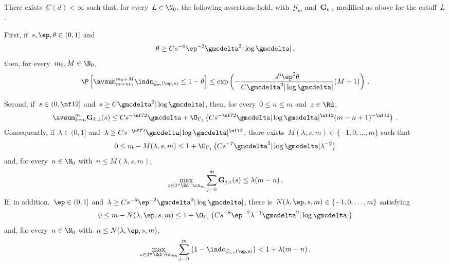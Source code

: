 \documentclass[11pt]{amsart}
\begin{document}
\begin{proposition}
\label{p.cutoff.regularity.good.scales}
There exists~$C(d)<\infty$ such that, for every~$L\in\N_0$, the following assertions hold, with~$\mathcal G_m$ and~$\mathbf G_{k,z}$ modified as above for the cutoff~$L$.

\smallskip

First, if~$s,\ep,\theta\in(0,1]$ and
\begin{equation}
	\theta
	\geq
	Cs^{-6}\ep^{-2}\gmcdelta^2|\log\gmcdelta|\,,
	\label{e.cutoff.regularity.density.parameters}
\end{equation}
then, for every~$m_0,M\in\N_0$,
\begin{equation}
	\P\left[
	\avsum_{m=m_0}^{m_0+M}
	\indc_{\mathcal G_m(\ep,s)}
	\leq
	1-\theta
	\right]
	\leq
	\exp\left(
	-\frac{s^6\ep^2\theta}
	{C\gmcdelta^2|\log\gmcdelta|}(M+1)
	\right)\,.
	\label{e.cutoff.regularity.density}
\end{equation}

\smallskip

Second, if~$s\in(0,\nf12]$ and~$s\geq C\gmcdelta^2|\log\gmcdelta|$, then, for every~$0\leq n\leq m$ and~$z\in\Rd$,
\begin{equation}
	\avsum_{k=n}^{m}\mathbf G_{k,z}(s)
	\leq
	Cs^{-\nf72}\gmcdelta
	+
	\O_{\Gamma_2}\left(
	Cs^{-\nf72}\gmcdelta|\log\gmcdelta|^{\nf12}
	(m-n+1)^{-\nf12}
	\right)\,.
	\label{e.cutoff.regularity.error.average}
\end{equation}
Consequently, if~$\lambda\in(0,1]$ and~$\lambda\geq Cs^{-\nf72}\gmcdelta|\log\gmcdelta|^{\nf12}$, there exists~$M(\lambda,s,m)\in\{-1,0,\ldots,m\}$ such that
\begin{equation}
	0\leq m-M(\lambda,s,m)
	\leq
	1+\O_{\Gamma_1}\left(
	Cs^{-7}\gmcdelta^2|\log\gmcdelta|\lambda^{-2}
	\right)
	\label{e.cutoff.regularity.error.stopping.tail}
\end{equation}
and, for every~$n\in\N_0$ with~$n\leq M(\lambda,s,m)$,
\begin{equation}
	\max_{z\in3^n\Zd\cap\cu_m}
	\sum_{j=n}^{m}\mathbf G_{j,z}(s)
	\leq
	\lambda(m-n)\,.
	\label{e.cutoff.regularity.error.stopping}
\end{equation}
If, in addition,~$\ep\in(0,1]$ and~$\lambda\geq Cs^{-8}\ep^{-2}\gmcdelta^2|\log\gmcdelta|$, there is~$N(\lambda,\ep,s,m)\in\{-1,0,\ldots,m\}$ satisfying
\begin{equation}
	0\leq m-N(\lambda,\ep,s,m)
	\leq
	1+\O_{\Gamma_1}\left(
	Cs^{-8}\ep^{-2}\lambda^{-1}
	\gmcdelta^2|\log\gmcdelta|
	\right)
	\label{e.cutoff.regularity.good.stopping.tail}
\end{equation}
and, for every~$n\in\N_0$ with~$n\leq N(\lambda,\ep,s,m)$,
\begin{equation}
	\max_{z\in3^n\Zd\cap\cu_m}
	\sum_{j=n}^{m}
	\left(1-\indc_{\mathcal G_{j,z}(\ep,s)}\right)
	<
	1+\lambda(m-n)\,.
	\label{e.cutoff.regularity.good.stopping}
\end{equation}


\end{proposition}
\end{document}
